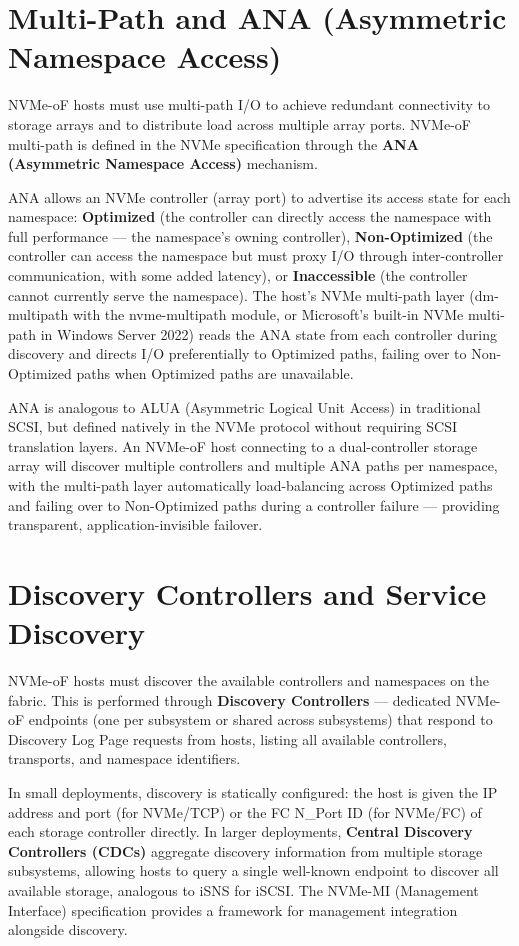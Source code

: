 \section{Multi-Path and ANA (Asymmetric Namespace Access)}
NVMe-oF hosts must use multi-path I/O to achieve redundant connectivity to storage arrays and to distribute load across multiple array ports. NVMe-oF multi-path is defined in the NVMe specification through the \textbf{ANA (Asymmetric Namespace Access)} mechanism.

ANA allows an NVMe controller (array port) to advertise its access state for each namespace: \textbf{Optimized} (the controller can directly access the namespace with full performance --- the namespace's owning controller), \textbf{Non-Optimized} (the controller can access the namespace but must proxy I/O through inter-controller communication, with some added latency), or \textbf{Inaccessible} (the controller cannot currently serve the namespace). The host's NVMe multi-path layer (dm-multipath with the nvme-multipath module, or Microsoft's built-in NVMe multi-path in Windows Server 2022) reads the ANA state from each controller during discovery and directs I/O preferentially to Optimized paths, failing over to Non-Optimized paths when Optimized paths are unavailable.

ANA is analogous to ALUA (Asymmetric Logical Unit Access) in traditional SCSI, but defined natively in the NVMe protocol without requiring SCSI translation layers. An NVMe-oF host connecting to a dual-controller storage array will discover multiple controllers and multiple ANA paths per namespace, with the multi-path layer automatically load-balancing across Optimized paths and failing over to Non-Optimized paths during a controller failure --- providing transparent, application-invisible failover.

\section{Discovery Controllers and Service Discovery}
NVMe-oF hosts must discover the available controllers and namespaces on the fabric. This is performed through \textbf{Discovery Controllers} --- dedicated NVMe-oF endpoints (one per subsystem or shared across subsystems) that respond to Discovery Log Page requests from hosts, listing all available controllers, transports, and namespace identifiers.

In small deployments, discovery is statically configured: the host is given the IP address and port (for NVMe/TCP) or the FC N\_Port ID (for NVMe/FC) of each storage controller directly. In larger deployments, \textbf{Central Discovery Controllers (CDCs)} aggregate discovery information from multiple storage subsystems, allowing hosts to query a single well-known endpoint to discover all available storage, analogous to iSNS for iSCSI. The NVMe-MI (Management Interface) specification provides a framework for management integration alongside discovery.

